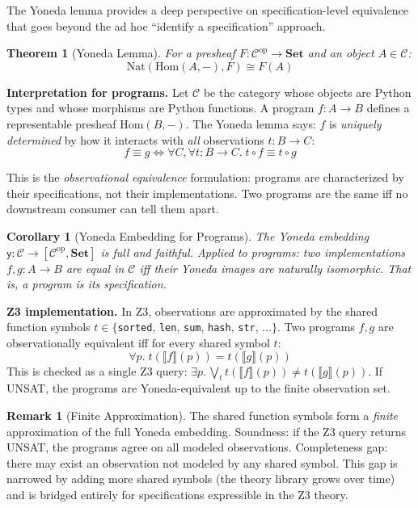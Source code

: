 \documentclass[11pt,a4paper]{report}
\theoremstyle{definition}
\newtheorem{remark}[definition]{Remark}
\theoremstyle{plain}
\newtheorem{theorem}[definition]{Theorem}
\newtheorem{corollary}[definition]{Corollary}
\newcommand{\den}[1]{\llbracket #1 \rrbracket}
\newcommand{\Set}{\mathbf{Set}}
\begin{document}
The Yoneda lemma provides a deep perspective on specification-level
equivalence that goes beyond the ad hoc ``identify a specification''
approach.

\begin{theorem}[Yoneda Lemma]
For a presheaf $F : \mathcal{C}^{\mathrm{op}} \to \Set$ and an
object $A \in \mathcal{C}$:
\[
  \mathrm{Nat}(\mathrm{Hom}(A, -), F) \cong F(A)
\]
\end{theorem}

\noindent\textbf{Interpretation for programs.}  Let $\mathcal{C}$
be the category whose objects are Python types and whose morphisms
are Python functions.  A program $f : A \to B$ defines a
representable presheaf $\mathrm{Hom}(B, -)$.  The Yoneda lemma
says: $f$ is \emph{uniquely determined} by how it interacts with
\emph{all} observations $t : B \to C$:
\[
  f \equiv g \iff \forall C, \forall t : B \to C.\;
    t \circ f \equiv t \circ g
\]

This is the \emph{observational equivalence} formulation: programs
are characterized by their specifications, not their implementations.
Two programs are the same iff no downstream consumer can tell them
apart.

\begin{corollary}[Yoneda Embedding for Programs]
\label{cor:yoneda-embed}
The Yoneda embedding $\mathsf{y} : \mathcal{C} \to [\mathcal{C}^{\mathrm{op}}, \Set]$
is full and faithful.  Applied to programs: two implementations
$f, g : A \to B$ are equal in $\mathcal{C}$ iff their Yoneda
images are naturally isomorphic.  That is, a program \emph{is}
its specification.
\end{corollary}

\noindent\textbf{Z3 implementation.}
In Z3, observations are approximated by
the shared function symbols $t \in \{$\texttt{sorted}, \texttt{len},
\texttt{sum}, \texttt{hash}, \texttt{str}, $\ldots\}$.  Two programs
$f, g$ are observationally equivalent iff for every shared symbol
$t$:
\[
  \forall p.\; t(\den{f}(p)) = t(\den{g}(p))
\]
This is checked as a single Z3 query: $\exists p.\, \bigvee_t
t(\den{f}(p)) \neq t(\den{g}(p))$.  If UNSAT, the programs are
Yoneda-equivalent up to the finite observation set.

\begin{remark}[Finite Approximation]
The shared function symbols form a \emph{finite} approximation of
the full Yoneda embedding.  Soundness: if the Z3 query returns
UNSAT, the programs agree on all modeled observations.
Completeness gap: there may exist an observation not modeled by
any shared symbol.  This gap is narrowed by adding more shared
symbols (the theory library grows over time) and is bridged entirely
for specifications expressible in the Z3 theory.
\end{remark}
\end{document}
